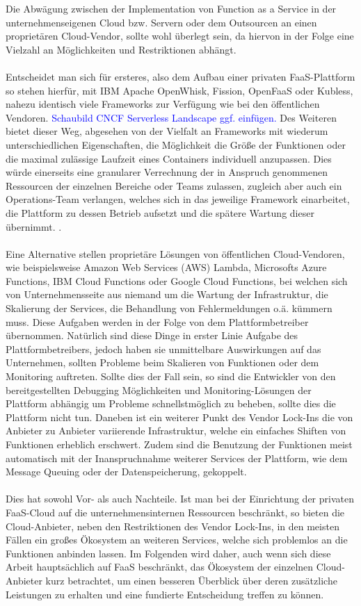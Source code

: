 \documentclass[11pt]{article}
\begin{document}
Die Abwägung zwischen der Implementation von Function as a Service in der unternehmenseigenen Cloud bzw. Servern oder dem Outsourcen an einen proprietären Cloud-Vendor, sollte wohl überlegt sein, da hiervon in der Folge eine Vielzahl an Möglichkeiten und Restriktionen abhängt. \\\\
Entscheidet man sich für ersteres, also dem Aufbau einer privaten FaaS-Plattform so stehen hierfür, mit IBM Apache OpenWhisk, Fission, OpenFaaS oder Kubless, nahezu identisch viele Frameworks zur Verfügung wie bei den öffentlichen Vendoren. \textcolor{blue}{Schaubild CNCF Serverless Landscape ggf. einfügen.} Des Weiteren bietet dieser Weg, abgesehen von der Vielfalt an Frameworks mit wiederum unterschiedlichen Eigenschaften, die Möglichkeit die Größe der Funktionen oder die maximal zulässige Laufzeit eines Containers individuell anzupassen. Dies würde einerseits eine granularer Verrechnung der in Anspruch genommenen Ressourcen der einzelnen Bereiche oder Teams zulassen, zugleich aber auch ein Operations-Team verlangen, welches sich in das jeweilige Framework einarbeitet, die Plattform zu dessen Betrieb aufsetzt und die spätere Wartung dieser übernimmt. \cite{mohanty2018evaluation}.\\\\
Eine Alternative stellen proprietäre Lösungen von öffentlichen Cloud-Vendoren, wie beispielsweise Amazon Web Services (AWS) Lambda, Microsofts Azure Functions, IBM Cloud Functions oder Google Cloud Functions, bei welchen sich von Unternehmensseite aus niemand um die Wartung der Infrastruktur, die Skalierung der Services, die Behandlung von Fehlermeldungen o.ä. kümmern muss. Diese Aufgaben werden in der Folge von dem Plattformbetreiber übernommen. Natürlich sind diese Dinge in erster Linie Aufgabe des Plattformbetreibers, jedoch haben sie unmittelbare Auswirkungen auf das Unternehmen, sollten Probleme beim Skalieren von Funktionen oder dem Monitoring auftreten. Sollte dies der Fall sein, so sind die Entwickler von den bereitgestellten Debugging Möglichkeiten und Monitoring-Lösungen der Plattform abhängig um Probleme schnellstmöglich zu beheben, sollte dies die Plattform nicht tun. Daneben ist ein weiterer Punkt des Vendor Lock-Ins die von Anbieter zu Anbieter variierende Infrastruktur, welche ein einfaches Shiften von Funktionen erheblich erschwert. Zudem sind die Benutzung der Funktionen meist automatisch mit der Inanspruchnahme weiterer Services der Plattform, wie dem Message Queuing oder der Datenspeicherung, gekoppelt. \\\\
Dies hat sowohl Vor- als auch Nachteile. Ist man bei der Einrichtung der privaten FaaS-Cloud auf die unternehmensinternen Ressourcen beschränkt, so bieten die Cloud-Anbieter, neben den Restriktionen des Vendor Lock-Ins, in den meisten Fällen ein großes Ökosystem an weiteren Services, welche sich problemlos an die Funktionen anbinden lassen. Im Folgenden wird daher, auch wenn sich diese Arbeit hauptsächlich auf FaaS beschränkt, das Ökosystem der einzelnen Cloud-Anbieter kurz betrachtet, um einen besseren Überblick über deren zusätzliche Leistungen zu erhalten und eine fundierte Entscheidung treffen zu können.
\end{document}
